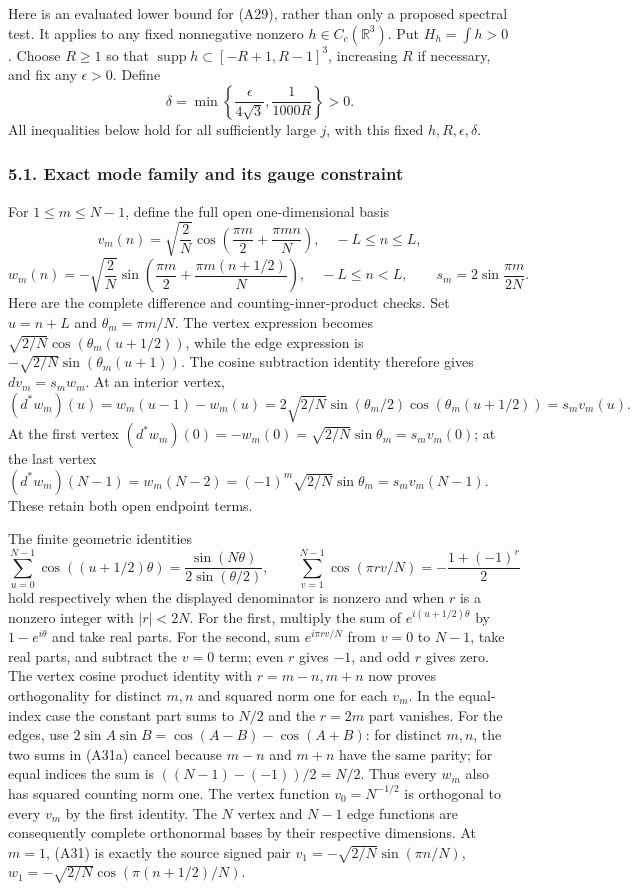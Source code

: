 \documentclass[
  11pt,
]{article}
\begin{document}
Here is an evaluated lower bound for (A29), rather than only a proposed
spectral test. It applies to any fixed nonnegative nonzero
\(h\in C_c(\mathbb R^3)\). Put \(H_h=\int h>0\). Choose \(R\ge1\) so
that \(\operatorname{supp}h\subset[-R+1,R-1]^3\), increasing \(R\) if
necessary, and fix any \(\epsilon>0\). Define \[
 \delta=\min\left\{\frac\epsilon{4\sqrt3},\frac1{1000R}\right\}>0.
\tag{A30}
\] All inequalities below hold for all sufficiently large \(j\), with
this fixed \(h,R,\epsilon,\delta\).

\subsubsection{5.1. Exact mode family and its gauge
constraint}\label{weak-coupling-part-10-exact-mode-family-and-its-gauge-constraint}

For \(1\le m\le N-1\), define the full open one-dimensional basis \[
 v_m(n)=\sqrt{\frac2N}\cos\left(\frac{\pi m}2+\frac{\pi mn}N\right),
 \quad -L\le n\le L,
\] \[
 w_m(n)=-\sqrt{\frac2N}\sin\left(\frac{\pi m}2+
                                      \frac{\pi m(n+1/2)}N\right),
 \quad -L\le n<L,
 \qquad s_m=2\sin\frac{\pi m}{2N}.
\tag{A31}
\] Here are the complete difference and counting-inner-product checks.
Set \(u=n+L\) and \(\theta_m=\pi m/N\). The vertex expression becomes
\(\sqrt{2/N}\cos(\theta_m(u+1/2))\), while the edge expression is
\(-\sqrt{2/N}\sin(\theta_m(u+1))\). The cosine subtraction identity
therefore gives \(dv_m=s_mw_m\). At an interior vertex, \[
 (d^*w_m)(u)=w_m(u-1)-w_m(u)
 =2\sqrt{2/N}\sin(\theta_m/2)\cos(\theta_m(u+1/2))
 =s_mv_m(u).
\] At the first vertex
\((d^*w_m)(0)=-w_m(0)=\sqrt{2/N}\sin\theta_m=s_mv_m(0)\); at the last
vertex
\((d^*w_m)(N-1)=w_m(N-2)=(-1)^m\sqrt{2/N}\sin\theta_m=s_mv_m(N-1)\).
These retain both open endpoint terms.

The finite geometric identities \[
 \sum_{u=0}^{N-1}\cos((u+1/2)\theta)
 =\frac{\sin(N\theta)}{2\sin(\theta/2)},
\qquad
 \sum_{v=1}^{N-1}\cos(\pi r v/N)
 =-\frac{1+(-1)^r}{2}
\tag{A31a}
\] hold respectively when the displayed denominator is nonzero and when
\(r\) is a nonzero integer with \(|r|<2N\). For the first, multiply the
sum of \(e^{i(u+1/2)\theta}\) by \(1-e^{i\theta}\) and take real parts.
For the second, sum \(e^{i\pi rv/N}\) from \(v=0\) to \(N-1\), take real
parts, and subtract the \(v=0\) term; even \(r\) gives \(-1\), and odd
\(r\) gives zero. The vertex cosine product identity with \(r=m-n,m+n\)
now proves orthogonality for distinct \(m,n\) and squared norm one for
each \(v_m\). In the equal-index case the constant part sums to \(N/2\)
and the \(r=2m\) part vanishes. For the edges, use
\(2\sin A\sin B=\cos(A-B)-\cos(A+B)\): for distinct \(m,n\), the two
sums in (A31a) cancel because \(m-n\) and \(m+n\) have the same parity;
for equal indices the sum is \(((N-1)-(-1))/2=N/2\). Thus every \(w_m\)
also has squared counting norm one. The vertex function \(v_0=N^{-1/2}\)
is orthogonal to every \(v_m\) by the first identity. The \(N\) vertex
and \(N-1\) edge functions are consequently complete orthonormal bases
by their respective dimensions. At \(m=1\), (A31) is exactly the source
signed pair \(v_1=-\sqrt{2/N}\sin(\pi n/N)\),
\(w_1=-\sqrt{2/N}\cos(\pi(n+1/2)/N)\).
\end{document}
